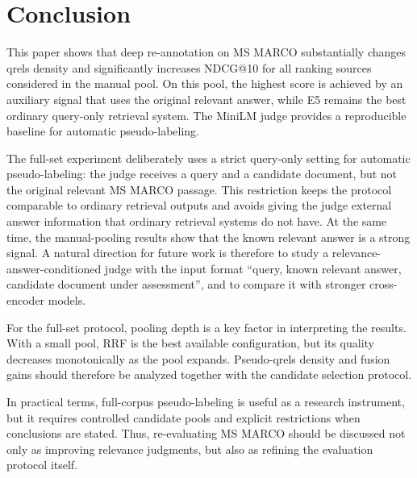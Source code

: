 \documentclass[runningheads,a4paper]{llncs}
\begin{document}
\section{Conclusion}

This paper shows that deep re-annotation on MS MARCO substantially changes qrels density and significantly increases NDCG@10 for all ranking sources considered in the manual pool. On this pool, the highest score is achieved by an auxiliary signal that uses the original relevant answer, while E5 remains the best ordinary query-only retrieval system. The MiniLM judge provides a reproducible baseline for automatic pseudo-labeling.

The full-set experiment deliberately uses a strict query-only setting for automatic pseudo-labeling: the judge receives a query and a candidate document, but not the original relevant MS MARCO passage. This restriction keeps the protocol comparable to ordinary retrieval outputs and avoids giving the judge external answer information that ordinary retrieval systems do not have. At the same time, the manual-pooling results show that the known relevant answer is a strong signal. A natural direction for future work is therefore to study a relevance-answer-conditioned judge with the input format ``query, known relevant answer, candidate document under assessment'', and to compare it with stronger cross-encoder models.

For the full-set protocol, pooling depth is a key factor in interpreting the results. With a small pool, RRF is the best available configuration, but its quality decreases monotonically as the pool expands. Pseudo-qrels density and fusion gains should therefore be analyzed together with the candidate selection protocol.

In practical terms, full-corpus pseudo-labeling is useful as a research instrument, but it requires controlled candidate pools and explicit restrictions when conclusions are stated. Thus, re-evaluating MS MARCO should be discussed not only as improving relevance judgments, but also as refining the evaluation protocol itself.
\end{document}
